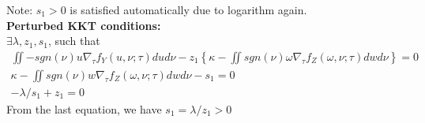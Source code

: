 \documentclass[10pt,a4paper]{article}
\begin{document}
Note: $s_1 > 0$ is satisfied automatically due to logarithm again. \\

\textbf{Perturbed KKT conditions:} \\

$ \exists \lambda ,z_{1},s_{1}$,   such that
\begin{gather*}
 \iint -sgn\left( \nu \right) u\nabla_{\tau} f_{Y}\left( u,\nu ;\tau \right) dud\nu -z_{1}\left\{ \kappa - \iint sgn\left( \nu \right) \omega \nabla _{\tau }f_{Z}\left( \omega ,\nu ;\tau \right) dwd\nu\right\} =0 \\
\kappa -\iint sgn\left( \nu \right) w\nabla _{\tau }f_{Z}\left( \omega ,\nu ;\tau \right) dwd\nu -s_{1}=0\\
-\lambda /s_{1}+z_{1}=0
\end{gather*}
From the last equation, we have $s_1 = \lambda / z_1 > 0$
\end{document}
